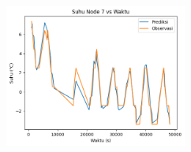 \documentclass[8pt]{beamer}
\begin{document}
\begin{frame}
\begin{columns}[T]
\begin{figure}
      \end{figure}
      \begin{figure}
          \includegraphics[width=0.7\textwidth]{figure/paper_node7_temp_2018-05-19.png}
      \end{figure}
  \end{columns}
\end{frame}
\end{document}
